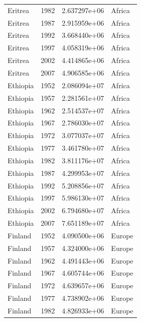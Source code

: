 \documentclass[
  letterpaper,
  DIV=11,
  numbers=noendperiod]{scrreprt}
\begin{document}
\begin{tcolorbox}
\begin{tabular}{lrrl}
Eritrea                  &  1982 &  2.637297e+06 &    Africa \\
Eritrea                  &  1987 &  2.915959e+06 &    Africa \\
Eritrea                  &  1992 &  3.668440e+06 &    Africa \\
Eritrea                  &  1997 &  4.058319e+06 &    Africa \\
Eritrea                  &  2002 &  4.414865e+06 &    Africa \\
Eritrea                  &  2007 &  4.906585e+06 &    Africa \\
Ethiopia                 &  1952 &  2.086094e+07 &    Africa \\
Ethiopia                 &  1957 &  2.281561e+07 &    Africa \\
Ethiopia                 &  1962 &  2.514537e+07 &    Africa \\
Ethiopia                 &  1967 &  2.786030e+07 &    Africa \\
Ethiopia                 &  1972 &  3.077037e+07 &    Africa \\
Ethiopia                 &  1977 &  3.461780e+07 &    Africa \\
Ethiopia                 &  1982 &  3.811176e+07 &    Africa \\
Ethiopia                 &  1987 &  4.299953e+07 &    Africa \\
Ethiopia                 &  1992 &  5.208856e+07 &    Africa \\
Ethiopia                 &  1997 &  5.986130e+07 &    Africa \\
Ethiopia                 &  2002 &  6.794680e+07 &    Africa \\
Ethiopia                 &  2007 &  7.651189e+07 &    Africa \\
Finland                  &  1952 &  4.090500e+06 &    Europe \\
Finland                  &  1957 &  4.324000e+06 &    Europe \\
Finland                  &  1962 &  4.491443e+06 &    Europe \\
Finland                  &  1967 &  4.605744e+06 &    Europe \\
Finland                  &  1972 &  4.639657e+06 &    Europe \\
Finland                  &  1977 &  4.738902e+06 &    Europe \\
Finland                  &  1982 &  4.826933e+06 &    Europe \\

\end{tabular}
\end{tcolorbox}
\end{document}
